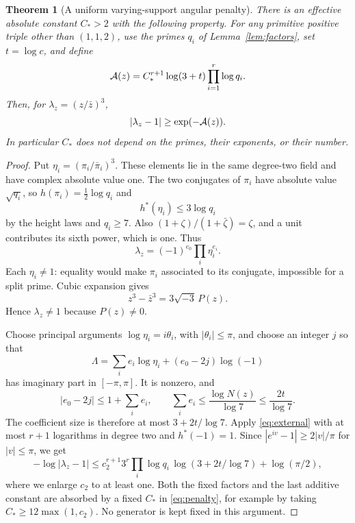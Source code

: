 \documentclass[11pt]{amsart}
\newtheorem{theorem}{Theorem}[section]
\theoremstyle{definition}\newtheorem{definition}[theorem]{Definition}
\theoremstyle{remark}\newtheorem{remark}[theorem]{Remark}
\begin{document}
\begin{theorem}[A uniform varying-support angular penalty]\label{thm:angle}
There is an effective absolute constant $C_*>2$ with the following property. For any primitive positive triple other than $(1,1,2)$, use the primes $q_i$ of Lemma~\ref{lem:factors}, set $t=\log c$, and define
\begin{equation}\label{eq:penalty}
 \mathcal A(z)=C_*^{r+1}\log(3+t)\prod_{i=1}^r\log q_i.
\end{equation}
Then, for $\lambda_z=(z/\bar z)^3$,
\begin{equation}\label{eq:angbound}
 |\lambda_z-1|\ge\exp(-\mathcal A(z)).
\end{equation}
In particular $C_*$ does not depend on the primes, their exponents, or their number.
\end{theorem}
\begin{proof}
Put $\eta_i=(\pi_i/\bar\pi_i)^3$. These elements lie in the same degree-two field and have complex absolute value one. The two conjugates of $\pi_i$ have absolute value $\sqrt{q_i}$, so $h(\pi_i)=\frac12\log q_i$ and
\[
 h^*(\eta_i)\le3\log q_i
\]
by the height laws and $q_i\ge7$. Also $(1+\zeta)/(1+\bar\zeta)=\zeta$, and a unit contributes its sixth power, which is one. Thus
\[
 \lambda_z=(-1)^{e_0}\prod_i\eta_i^{e_i}.
\]
Each $\eta_i\ne1$: equality would make $\pi_i$ associated to its conjugate, impossible for a split prime. Cubic expansion gives
\begin{equation}\label{eq:cubic}
 z^3-\bar z^3=3\sqrt{-3}\,P(z).
\end{equation}
Hence $\lambda_z\ne1$ because $P(z)\ne0$.

Choose principal arguments $\log\eta_i=i\theta_i$, with $|\theta_i|\le\pi$, and choose an integer $j$ so that
\[
 \Lambda=\sum_i e_i\log\eta_i+(e_0-2j)\log(-1)
\]
has imaginary part in $[-\pi,\pi]$. It is nonzero, and
\[
 |e_0-2j|\le1+\sum_i e_i,
 \qquad \sum_i e_i\le\frac{\log N(z)}{\log7}\le\frac{2t}{\log7}.
\]
The coefficient size is therefore at most $3+2t/\log7$. Apply \eqref{eq:external} with at most $r+1$ logarithms in degree two and $h^*(-1)=1$. Since $|e^{iv}-1|\ge2|v|/\pi$ for $|v|\le\pi$, we get
\[
 -\log|\lambda_z-1|
 \le c_2^{r+1}3^r\prod_i\log q_i\,
       \log(3+2t/\log7)+\log(\pi/2),
\]
where we enlarge $c_2$ to at least one. Both the fixed factors and the last additive constant are absorbed by a fixed $C_*$ in \eqref{eq:penalty}, for example by taking $C_*\ge12\max(1,c_2)$. No generator is kept fixed in this argument.
\end{proof}
\end{document}

